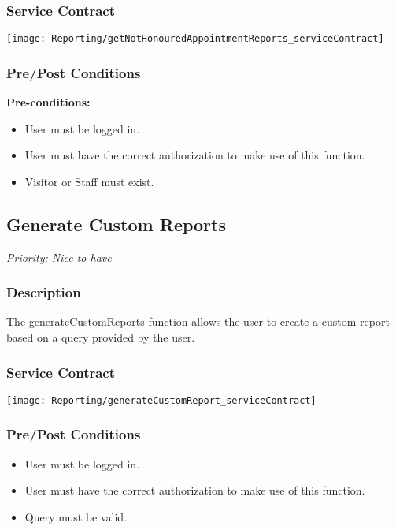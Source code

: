 \subsubsection{Service Contract}
\texttt{[image: Reporting/getNotHonouredAppointmentReports\_serviceContract]}
\subsubsection{Pre/Post Conditions}
	\textbf{Pre-conditions:}
	\begin{itemize}
		\item User must be logged in.
		\item User must have the correct authorization to make use of this function.
		\item Visitor or Staff must exist.
	\end{itemize}

\subsection{Generate Custom Reports}
\textit{Priority: \textcolor{myGreen}{Nice to have}}

\subsubsection{Description}
The generateCustomReports function allows the user to create a custom report based on a query provided by the user.

\subsubsection{Service Contract}
\texttt{[image: Reporting/generateCustomReport\_serviceContract]}

\subsubsection{Pre/Post Conditions}
	\begin{itemize}
		\item User must be logged in.
		\item User must have the correct authorization to make use of this function.
		\item Query must be valid.
	\end{itemize}


